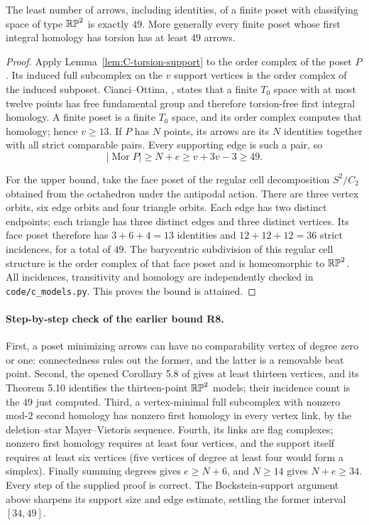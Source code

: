\begin{theorem}\label{thm:C-poset49}
The least number of arrows, including identities, of a finite poset with
classifying space of type $\mathbb {RP}^2$ is exactly $49$. More generally every
finite poset whose first integral homology has torsion has at least
$49$ arrows.
\end{theorem}
\begin{proof}
Apply Lemma~\ref{lem:C-torsion-support} to the order complex of the poset
$P$. Its induced full subcomplex on the $v$ support vertices is the
order complex of the induced subposet. Cianci--Ottina,
\cite[Theorem 5.7]{cianciottina2015}, states that a finite $T_0$ space
with at most twelve points has free fundamental group and therefore
torsion-free first integral homology. A finite poset is a finite $T_0$
space, and its order complex computes that homology; hence $v\ge13$.
If $P$ has $N$ points, its arrows are its $N$ identities together with
all strict comparable pairs. Every supporting edge is such a pair, so
\[
 |\operatorname{Mor}P|\ge N+e\ge v+3v-3\ge49.
\]

For the upper bound, take the face poset of the regular cell decomposition
$S^2/C_2$ obtained from the octahedron under the antipodal action.
There are three vertex orbits, six edge orbits and four triangle orbits.
Each edge has two distinct endpoints; each triangle has three distinct
edges and three distinct vertices. Its face poset therefore has
$3+6+4=13$ identities and $12+12+12=36$ strict incidences, for a total
of $49$. The barycentric subdivision of this regular cell structure
is the order complex of that face poset and is homeomorphic to $\mathbb {RP}^2$.
All incidences, transitivity and homology are independently checked in
\texttt{code/c\_models.py}. This proves the bound is attained.
\end{proof}

\paragraph{Step-by-step check of the earlier bound R8.}
First, a poset minimizing arrows can have no comparability vertex of
degree zero or one: connectedness rules out the former, and the latter
is a removable beat point. Second, the opened Corollary 5.8 of
\cite{cianciottina2015} gives at least thirteen vertices, and its
Theorem 5.10 identifies the thirteen-point $\mathbb {RP}^2$ models; their incidence
count is the $49$ just computed. Third, a vertex-minimal full subcomplex
with nonzero mod-$2$ second homology has nonzero first homology in every
vertex link, by the deletion--star Mayer--Vietoris sequence. Fourth,
its links are flag complexes; nonzero first homology requires at least
four vertices, and the support itself requires at least six vertices
(five vertices of degree at least four would form a simplex).
Finally summing degrees gives $e\ge N+6$, and $N\ge14$ gives
$N+e\ge34$. Every step of the supplied proof is correct. The
Bockstein-support argument above sharpens its support size and edge
estimate, settling the former interval $[34,49]$.

